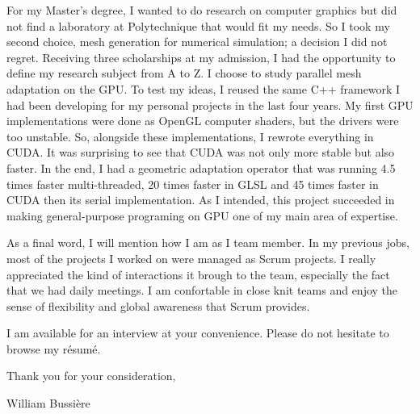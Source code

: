 For my Master's degree, I wanted to do research on computer graphics but did not find a laboratory at Polytechnique that would fit my needs. So I took my second choice, mesh generation for numerical simulation; a decision I did not regret. Receiving three scholarships at my admission, I had the opportunity to define my research subject from A to Z. I choose to study parallel mesh adaptation on the GPU. To test my ideas, I reused the same C++ framework I had been developing for my personal projects in the last four years. My first GPU implementations were done as OpenGL computer shaders, but the drivers were too unstable. So, alongside these implementations, I rewrote everything in CUDA. It was surprising to see that CUDA was not only more stable but also faster. In the end, I had a geometric adaptation operator that was running 4.5 times faster multi-threaded, 20 times faster in GLSL and 45 times faster in CUDA then its serial implementation. As I intended, this project succeeded in making general-purpose programing on GPU one of my main area of expertise.

As a final word, I will mention how I am as I team member. In my previous jobs, most of the projects I worked on were managed as Scrum projects. I really appreciated the kind of interactions it brough to the team, especially the fact that we had daily meetings. I am confortable in close knit teams and enjoy the sense of flexibility and global awareness that Scrum provides.

I am available for an interview at your convenience. Please do not hesitate to browse my résumé.

Thank you for your consideration,


William Bussière
